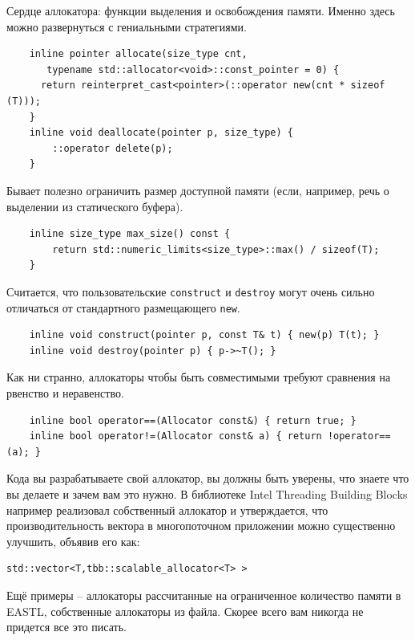 \documentclass[a4paper,12pt,oneside]{article}
\begin{document}
Сердце аллокатора: функции выделения и освобождения памяти. Именно здесь можно развернуться с гениальными стратегиями.

\begin{lstlisting}
    inline pointer allocate(size_type cnt, 
       typename std::allocator<void>::const_pointer = 0) { 
      return reinterpret_cast<pointer>(::operator new(cnt * sizeof (T))); 
    }
    inline void deallocate(pointer p, size_type) { 
        ::operator delete(p); 
    }
\end{lstlisting}

Бывает полезно ограничить размер доступной памяти (если, например, речь о выделении из статического буфера).

\begin{lstlisting}
    inline size_type max_size() const { 
        return std::numeric_limits<size_type>::max() / sizeof(T);
    }
\end{lstlisting}

Считается, что пользовательские \lstinline!construct! и \lstinline!destroy! могут очень сильно отличаться от стандартного размещающего \lstinline!new!.

\begin{lstlisting}
    inline void construct(pointer p, const T& t) { new(p) T(t); }
    inline void destroy(pointer p) { p->~T(); }
\end{lstlisting}

Как ни странно, аллокаторы чтобы быть совместимыми требуют сравнения на рвенство и неравенство.

\begin{lstlisting}
    inline bool operator==(Allocator const&) { return true; }
    inline bool operator!=(Allocator const& a) { return !operator==(a); }
\end{lstlisting}

Кода вы разрабатываете свой аллокатор, вы должны быть уверены, что знаете что вы делаете и зачем вам это нужно. В библиотеке Intel Threading Building Blocks например реализовал собственный аллокатор и утверждается, что производительность вектора в многопоточном приложении можно существенно улучшить, объявив его как:

\begin{lstlisting}
std::vector<T,tbb::scalable_allocator<T> >
\end{lstlisting}

Ещё примеры -- аллокаторы рассчитанные на ограниченное количество памяти в EASTL, собственные аллокаторы из файла. Скорее всего вам никогда не придется все это писать.
\end{document}
